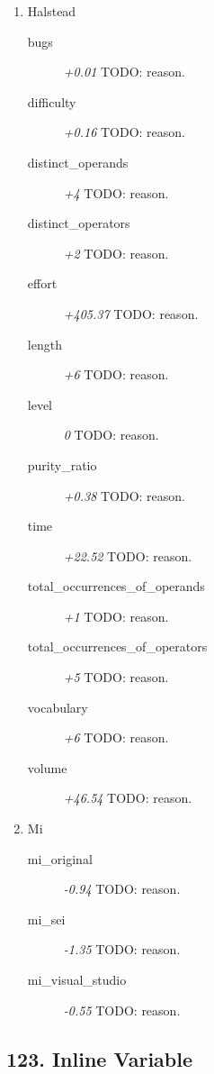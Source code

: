 \begin{enumerate}
  \item Halstead
        \begin{description}
          \item [bugs] \textit{+0.01} TODO: reason.
          \item [difficulty] \textit{+0.16} TODO: reason.
          \item [distinct\_operands] \textit{+4} TODO: reason.
          \item [distinct\_operators] \textit{+2} TODO: reason.
          \item [effort] \textit{+405.37} TODO: reason.
          \item [length] \textit{+6} TODO: reason.
          \item [level] \textit{0} TODO: reason.
          \item [purity\_ratio] \textit{+0.38} TODO: reason.
          \item [time] \textit{+22.52} TODO: reason.
          \item [total\_occurrences\_of\_operands] \textit{+1} TODO: reason.
          \item [total\_occurrences\_of\_operators] \textit{+5} TODO: reason.
          \item [vocabulary] \textit{+6} TODO: reason.
          \item [volume] \textit{+46.54} TODO: reason.
        \end{description}
  \item Mi
        \begin{description}
          \item [mi\_original] \textit{-0.94} TODO: reason.
          \item [mi\_sei] \textit{-1.35} TODO: reason.
          \item [mi\_visual\_studio] \textit{-0.55} TODO: reason.
        \end{description}
\end{enumerate}
\subsection{123. Inline Variable}

